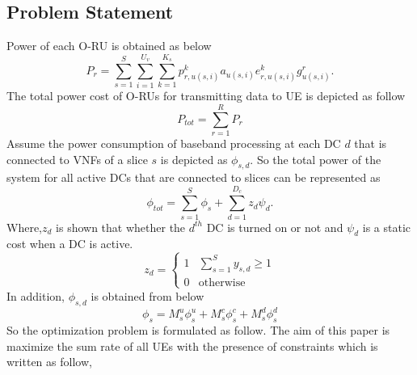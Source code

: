 \documentclass[conference]{IEEEtran}
\begin{document}
\subsection{Problem Statement}
Power of each O-RU is obtained as below
\begin{equation}
P_r =  \sum_{s=1}^{S} \sum_{i=1}^{U_v} \sum_{k=1}^{K_s}p_{r,u(s,i)}^{k}a_{u(s,i)} e^{k}_{r,u(s,i)}g_{u(s,i)}^r.
\end{equation}
The total power cost of O-RUs for transmitting data to UE is depicted as follow
\begin{equation}
P_{tot} = \sum_{r=1}^{R}P_r
\end{equation}
Assume the power consumption of baseband processing at each DC $d$ that is connected to VNFs of a slice $s$ is depicted as
$\phi_{s,d}$. So the total power of the system for all active DCs that are connected to slices can be represented as
\begin{equation*}
\textstyle \phi_{tot} = \sum_{s=1}^{S}\phi_{s} + \sum_{d=1}^{D_c}z_d \psi_d .
\end{equation*}
Where,$z_d$ is shown that whether the $d^{th}$ DC is turned on or not and $\psi_d$ is a static cost when a DC is active.
\begin{equation}
  z_d =
    \begin{cases}
      1 & \sum_{s=1}^{S}y_{s,d} \geq 1 \\
      0 & \text{otherwise}
    \end{cases}       
\end{equation}  
In addition, $\phi_{s,d}$ is obtained from below
\begin{equation}
\phi_{s} = M_s^u \phi_s^u + M_s^c \phi_s^c+ M_s^d \phi_s^d
\end{equation}
So the optimization problem is formulated as follow.
The aim of this paper is maximize the sum rate of all UEs with the presence of constraints which is written as follow,
\end{document}
